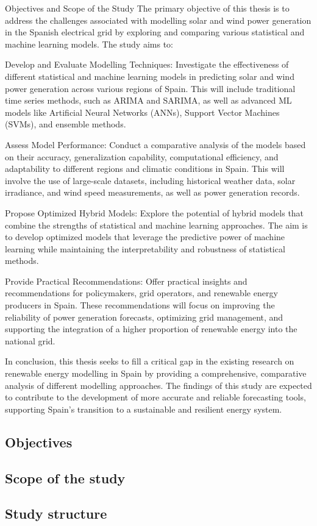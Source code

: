 Objectives and Scope of the Study
The primary objective of this thesis is to address the challenges associated with modelling solar and wind power generation in the Spanish electrical grid by exploring and comparing various statistical and machine learning models. The study aims to:

Develop and Evaluate Modelling Techniques: Investigate the effectiveness of different statistical and machine learning models in predicting solar and wind power generation across various regions of Spain. This will include traditional time series methods, such as ARIMA and SARIMA, as well as advanced ML models like Artificial Neural Networks (ANNs), Support Vector Machines (SVMs), and ensemble methods.

Assess Model Performance: Conduct a comparative analysis of the models based on their accuracy, generalization capability, computational efficiency, and adaptability to different regions and climatic conditions in Spain. This will involve the use of large-scale datasets, including historical weather data, solar irradiance, and wind speed measurements, as well as power generation records.

Propose Optimized Hybrid Models: Explore the potential of hybrid models that combine the strengths of statistical and machine learning approaches. The aim is to develop optimized models that leverage the predictive power of machine learning while maintaining the interpretability and robustness of statistical methods.

Provide Practical Recommendations: Offer practical insights and recommendations for policymakers, grid operators, and renewable energy producers in Spain. These recommendations will focus on improving the reliability of power generation forecasts, optimizing grid management, and supporting the integration of a higher proportion of renewable energy into the national grid.

In conclusion, this thesis seeks to fill a critical gap in the existing research on renewable energy modelling in Spain by providing a comprehensive, comparative analysis of different modelling approaches. The findings of this study are expected to contribute to the development of more accurate and reliable forecasting tools, supporting Spain’s transition to a sustainable and resilient energy system.

\subsection{Objectives}
\subsection{Scope of the study}
\subsection{Study structure}
